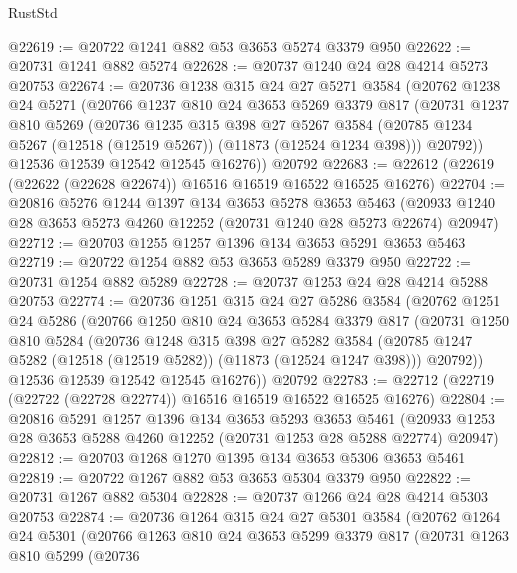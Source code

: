 \begin{lexlean}{RustStd}
\begin{coremodule}
@22619 := @20722 @1241 @882 @53 @3653 @5274 @3379 @950
@22622 := @20731 @1241 @882 @5274
@22628 := @20737 @1240 @24 @28 @4214 @5273 @20753
@22674 := @20736
    @1238
    @315
    @24
    @27
    @5271
    @3584
    (@20762
      @1238
      @24
      @5271
      (@20766
        @1237
        @810
        @24
        @3653
        @5269
        @3379
        @817
        (@20731
          @1237
          @810
          @5269
          (@20736
            @1235
            @315
            @398
            @27
            @5267
            @3584
            (@20785 @1234 @5267 (@12518 (@12519 @5267)) (@11873 (@12524 @1234 @398)))
            @20792))
        @12536
        @12539
        @12542
        @12545
        @16276))
    @20792
@22683 := @22612 (@22619 (@22622 (@22628 @22674)) @16516 @16519 @16522 @16525 @16276)
@22704 := @20816
    @5276
    @1244
    @1397
    @134
    @3653
    @5278
    @3653
    @5463
    (@20933 @1240 @28 @3653 @5273 @4260 @12252 (@20731 @1240 @28 @5273 @22674) @20947)
@22712 := @20703 @1255 @1257 @1396 @134 @3653 @5291 @3653 @5463
@22719 := @20722 @1254 @882 @53 @3653 @5289 @3379 @950
@22722 := @20731 @1254 @882 @5289
@22728 := @20737 @1253 @24 @28 @4214 @5288 @20753
@22774 := @20736
    @1251
    @315
    @24
    @27
    @5286
    @3584
    (@20762
      @1251
      @24
      @5286
      (@20766
        @1250
        @810
        @24
        @3653
        @5284
        @3379
        @817
        (@20731
          @1250
          @810
          @5284
          (@20736
            @1248
            @315
            @398
            @27
            @5282
            @3584
            (@20785 @1247 @5282 (@12518 (@12519 @5282)) (@11873 (@12524 @1247 @398)))
            @20792))
        @12536
        @12539
        @12542
        @12545
        @16276))
    @20792
@22783 := @22712 (@22719 (@22722 (@22728 @22774)) @16516 @16519 @16522 @16525 @16276)
@22804 := @20816
    @5291
    @1257
    @1396
    @134
    @3653
    @5293
    @3653
    @5461
    (@20933 @1253 @28 @3653 @5288 @4260 @12252 (@20731 @1253 @28 @5288 @22774) @20947)
@22812 := @20703 @1268 @1270 @1395 @134 @3653 @5306 @3653 @5461
@22819 := @20722 @1267 @882 @53 @3653 @5304 @3379 @950
@22822 := @20731 @1267 @882 @5304
@22828 := @20737 @1266 @24 @28 @4214 @5303 @20753
@22874 := @20736
    @1264
    @315
    @24
    @27
    @5301
    @3584
    (@20762
      @1264
      @24
      @5301
      (@20766
        @1263
        @810
        @24
        @3653
        @5299
        @3379
        @817
        (@20731
          @1263
          @810
          @5299
          (@20736

\end{coremodule}
\end{lexlean}
